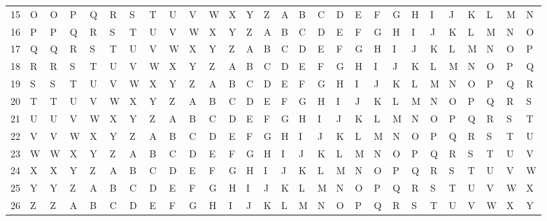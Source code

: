\documentclass[landscape,twocolumn,a4paper]{article}
\begin{document}
{\begin{tabular}{l l| l l l l l l l l l l l l l l l l l l l l l l l l l l}
15 & O & O & P & Q & R & S & T & U & V & W & X & Y & Z & A & B & C & D & E & F & G & H & I & J & K & L & M & N\\
16 & P & P & Q & R & S & T & U & V & W & X & Y & Z & A & B & C & D & E & F & G & H & I & J & K & L & M & N & O\\
17 & Q & Q & R & S & T & U & V & W & X & Y & Z & A & B & C & D & E & F & G & H & I & J & K & L & M & N & O & P\\
18 & R & R & S & T & U & V & W & X & Y & Z & A & B & C & D & E & F & G & H & I & J & K & L & M & N & O & P & Q\\
19 & S & S & T & U & V & W & X & Y & Z & A & B & C & D & E & F & G & H & I & J & K & L & M & N & O & P & Q & R\\
20 & T & T & U & V & W & X & Y & Z & A & B & C & D & E & F & G & H & I & J & K & L & M & N & O & P & Q & R & S\\
21 & U & U & V & W & X & Y & Z & A & B & C & D & E & F & G & H & I & J & K & L & M & N & O & P & Q & R & S & T\\
22 & V & V & W & X & Y & Z & A & B & C & D & E & F & G & H & I & J & K & L & M & N & O & P & Q & R & S & T & U\\
23 & W & W & X & Y & Z & A & B & C & D & E & F & G & H & I & J & K & L & M & N & O & P & Q & R & S & T & U & V\\
24 & X & X & Y & Z & A & B & C & D & E & F & G & H & I & J & K & L & M & N & O & P & Q & R & S & T & U & V & W\\
25 & Y & Y & Z & A & B & C & D & E & F & G & H & I & J & K & L & M & N & O & P & Q & R & S & T & U & V & W & X\\
26 & Z & Z & A & B & C & D & E & F & G & H & I & J & K & L & M & N & O & P & Q & R & S & T & U & V & W & X & Y\\
\end{tabular}
}
\end{document}
